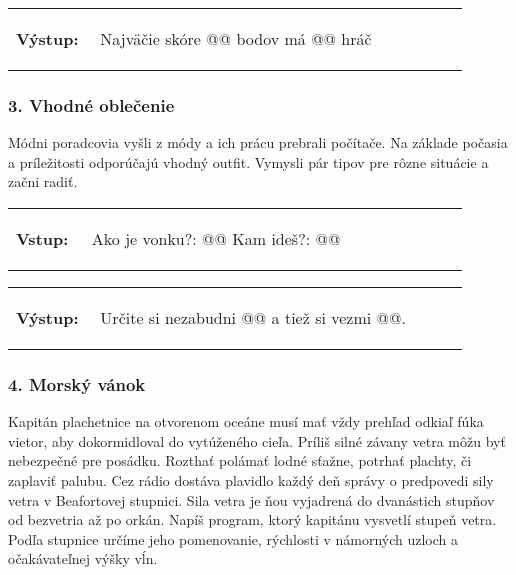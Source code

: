 \vspace{-2em}
\begin{tabular}{@{}p{0.15\linewidth}p{0.75\linewidth}}
\textbf{\small Výstup:} &
\vspace{-3em}
\begin{code}
Najväčie skóre @\fbox{\phantom{vstup}}@ bodov má @\fbox{\phantom{vstup}}@ hráč
\end{code}
\end{tabular}
\vspace{-2em}


\subsubsection*{3. Vhodné oblečenie}
Módni poradcovia vyšli z módy a ich prácu prebrali počítače. Na základe počasia a príležitosti odporúčajú vhodný outfit. Vymysli pár tipov pre rôzne situácie a začni radiť.

\begin{tabular}{@{}p{0.15\linewidth}p{0.75\linewidth}}
\textbf{\small Vstup:} &
\vspace{-3em}
\begin{code}
Ako je vonku?: @\fbox{\phantom{vstup}}@
Kam ideš?: @\fbox{\phantom{vstup}}@
\end{code}
\end{tabular}

\vspace{-2em}
\begin{tabular}{@{}p{0.15\linewidth}p{0.75\linewidth}}
\textbf{\small Výstup:} &
\vspace{-3em}
\begin{code}
Určite si nezabudni @\fbox{\phantom{vstup}}@ a tiež si vezmi @\fbox{\phantom{vstup}}@.
\end{code}
\end{tabular}
\vspace{-2em}

\subsubsection*{4. Morský vánok}
Kapitán plachetnice na otvorenom oceáne musí mať vždy prehľad odkiaľ fúka vietor, aby dokormidloval do vytúženého cieľa. Príliš silné závany vetra môžu byť nebezpečné pre posádku. Rozthať polámať lodné sťažne, potrhať plachty, či zaplaviť palubu. Cez rádio dostáva plavidlo každý deň správy o predpovedi sily vetra v Beafortovej stupnici. Sila vetra je ňou vyjadrená do dvanástich stupňov od bezvetria až po orkán. Napíš program, ktorý kapitánu vysvetlí stupeň vetra. Podľa stupnice určíme jeho pomenovanie, rýchlosti v námorných uzloch a očakávateľnej výšky vĺn.

